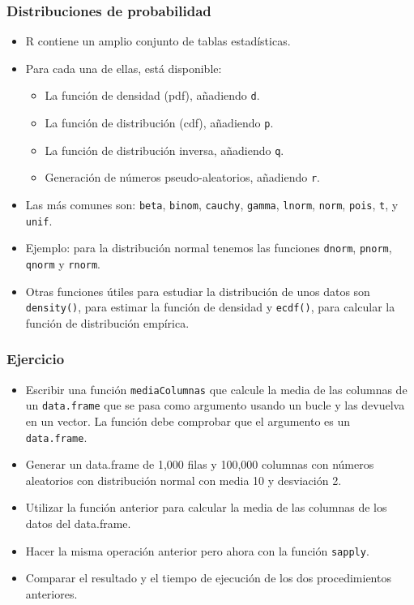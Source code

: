\documentclass{beamer}
\begin{document}
\begin{frame}
\frametitle{Distribuciones de probabilidad}
\begin{itemize}
\item R contiene un amplio conjunto de tablas estadísticas.
\item Para cada una de ellas, está disponible:
\begin{itemize}
\item La función de densidad (pdf), añadiendo \texttt{d}.
\item La función de distribución (cdf), añadiendo \texttt{p}.
\item La función de distribución inversa, añadiendo \texttt{q}.
\item Generación de números pseudo-aleatorios, añadiendo \texttt{r}.
\end{itemize}
\item Las más comunes son: \texttt{beta}, \texttt{binom}, \texttt{cauchy}, \texttt{gamma}, \texttt{lnorm}, \texttt{norm}, \texttt{pois}, \texttt{t}, y \texttt{unif}.
\item Ejemplo: para la distribución normal tenemos las funciones \texttt{dnorm}, \texttt{pnorm}, \texttt{qnorm} y \texttt{rnorm}.
\item Otras funciones útiles para estudiar la distribución de unos datos son \texttt{density()}, para estimar la función de densidad y \texttt{ecdf()}, para calcular la función de distribución empírica.
\end{itemize}
\end{frame}


\begin{frame}
\frametitle{Ejercicio}
\begin{itemize}
\item Escribir una función \texttt{mediaColumnas} que calcule la media de las columnas de un \texttt{data.frame} que se pasa como argumento usando un bucle y las devuelva en un vector. La función debe comprobar que el argumento es un \texttt{data.frame}.
\item Generar un data.frame de 1,000 filas y 100,000 columnas con números aleatorios con distribución normal con media 10 y desviación 2.
\item Utilizar la función anterior para calcular la media de las columnas de los datos del data.frame.
\item Hacer la misma operación anterior pero ahora con la función \texttt{sapply}.
\item Comparar el resultado y el tiempo de ejecución de los dos procedimientos anteriores.
\end{itemize}
\end{frame}
\end{document}
